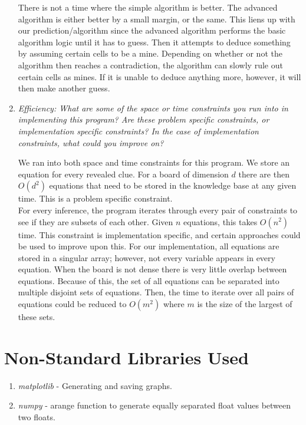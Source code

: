 \documentclass[12pt, twoside]{article}
\begin{document}
\begin{enumerate}[itemsep=2mm,parsep=4mm]
        There is not a time where the simple algorithm is better. The advanced algorithm is either better by a small margin, or the same. This liens up with our prediction/algorithm since the advanced algorithm performs the basic algorithm logic until it has to guess. Then it attempts to deduce something by assuming certain cells to be a mine. Depending on whether or not the algorithm then reaches a contradiction, the algorithm can slowly rule out certain cells as mines. If it is unable to deduce anything more, however, it will then make another guess.

        \vfill
        \pagebreak

    \item 
        \textit{Efficiency: What are some of the space or time constraints you run into in implementing this program? Are these problem specific constraints, or implementation specific constraints? In the case of implementation constraints, what could you improve on?}

        We ran into both space and time constraints for this program. We store an equation for every revealed clue. For a board of dimension $d$ there are then $O(d^2)$ equations that need to be stored in the knowledge base at any given time. This is a problem specific constraint. \\
        For every inference, the program iterates through every pair of constraints to see if they are subsets of each other. Given $n$ equations, this takes $O(n^2)$ time. This constraint is implementation specific, and certain approaches could be used to improve upon this. For our implementation, all equations are stored in a singular array; however, not every variable appears in every equation. When the board is not dense there is very little overlap between equations. Because of this, the set of all equations can be separated into multiple disjoint sets of equations. Then, the time to iterate over all pairs of equations could be reduced to $O(m^2)$ where $m$ is the size of the largest of these sets.

\end{enumerate}
 
\vfill
\pagebreak
\section{Non-Standard Libraries Used}

\begin{enumerate}
    \item
        \textit{matplotlib} - Generating and saving graphs.
    \item
        \textit{numpy} - arange function to generate equally separated float values between two floats.
\end{enumerate}
 
\end{document}
